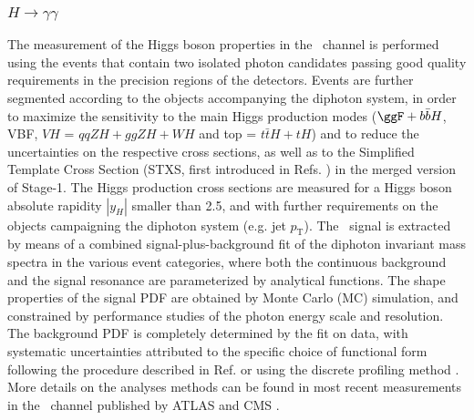 \subsubsection{$H \to \gamma\gamma$}
\label{sec:Hgammagamma}

The measurement of the Higgs boson properties in the \Hyy\ channel is performed using the events that contain two isolated photon candidates passing good quality requirements in the precision regions of the detectors. Events are further segmented according to the objects accompanying the diphoton system, in order to maximize the sensitivity to the main Higgs production modes ($\ggF+b\bar{b}H$, VBF, $VH$ = $qqZH+ggZH+WH$ and top = $t\bar{t}H+tH$) and to reduce the uncertainties on the respective cross sections, as well as to the Simplified Template Cross Section (STXS, first introduced in Refs. \cite{deFlorian:2016spz,Badger:2016bpw}) in the merged version of Stage-1.
The Higgs production cross sections are measured for a Higgs boson absolute rapidity $|y_H|$ smaller than 2.5, and with further requirements on the objects campaigning the diphoton system (e.g. jet $p_\mathrm{T}$).
The \Hyy\ signal is extracted by means of a combined signal-plus-background fit of the diphoton invariant mass spectra in the various event categories, where both the continuous background and the signal resonance are parameterized by analytical functions. The shape properties of the signal PDF are obtained by Monte Carlo (MC) simulation, and constrained by performance studies of the photon energy scale and resolution. The background PDF is completely determined by the fit on data, with systematic uncertainties attributed to the specific choice of functional form following the procedure described in Ref. \cite{Aad:2012tfa} or using the discrete profiling method \cite{Dauncey:2014xga}. More details on the analyses methods can be found in most recent measurements in the \Hyy\ channel published by ATLAS \cite{ATLAS:2018uso} and CMS \cite{Sirunyan:2018ouh}. 

